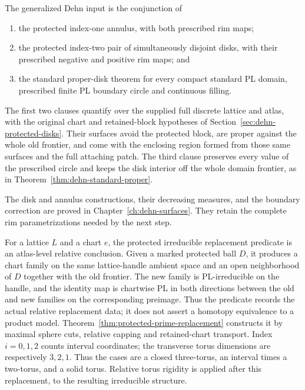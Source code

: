 \begin{definition}
\label{def:generalized-dehn}
The generalized Dehn input is the conjunction of
\begin{enumerate}
\item the protected index-one annulus, with both prescribed rim maps;
\item the protected index-two pair of simultaneously disjoint disks,
with their prescribed negative and positive rim maps; and
\item the standard proper-disk theorem for every compact standard PL
domain, prescribed finite PL boundary circle and continuous filling.
\end{enumerate}
The first two clauses quantify over the supplied full discrete lattice
and atlas, with the original chart and retained-block hypotheses of
Section~\ref{sec:dehn-protected-disks}.  Their surfaces avoid the
protected block, are proper against the whole old frontier, and come
with the enclosing region formed from those same surfaces and the full
attaching patch.  The third clause preserves every value of the
prescribed circle and keeps the disk interior off the whole domain
frontier, as in Theorem~\ref{thm:dehn-standard-proper}.
\end{definition}

The disk and annulus constructions, their decreasing measures, and the
boundary correction are proved in Chapter~\ref{ch:dehn-surfaces}.
They retain the complete rim parametrizations needed by the next step.

For a lattice $L$ and a chart $e$, the protected irreducible replacement
predicate is an atlas-level relative conclusion.  Given a marked protected
ball $D$, it produces a chart family on the same lattice-handle ambient
space and an open neighborhood of $D$ together with the old frontier.  The
new family is PL-irreducible on the handle, and the identity map is
chartwise PL in both directions between the old and new families on the
corresponding preimage.  Thus the predicate records the actual relative
replacement data; it does not assert a homotopy equivalence to a product
model. Theorem~\ref{thm:protected-prime-replacement} constructs it by
maximal sphere cuts, relative capping and retained-chart transport. Index
$i=0,1,2$ counts interval coordinates; the transverse torus dimensions are
respectively $3,2,1$. Thus the cases are a closed three-torus, an
interval times a two-torus, and a solid torus. Relative torus rigidity is
applied after this replacement, to the resulting irreducible structure.

